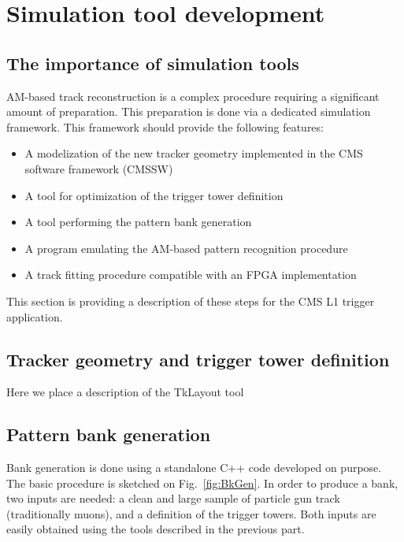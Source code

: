 \section{Simulation tool development}

\subsection{The importance of simulation tools}

\noindent AM-based track reconstruction is a complex procedure requiring a significant amount of preparation. This preparation is done via a dedicated simulation framework. This framework should provide the following features:

\begin{itemize}
\item A modelization of the new tracker geometry implemented in the CMS software framework (CMSSW)
\item A tool for optimization of the trigger tower definition
\item A tool performing the pattern bank generation
\item A program emulating the AM-based pattern recognition procedure
\item A track fitting procedure compatible with an FPGA implementation  
\end{itemize}

\noindent This section is providing a description of these steps for the CMS L1 trigger application. 

\subsection{Tracker geometry and trigger tower definition}

\noindent Here we place a description of the TkLayout tool

\subsection{Pattern bank generation}

\noindent Bank generation is done using a standalone C++ code developed on purpose. The basic procedure is sketched on Fig.~\ref{fig:BkGen}. In order to produce a bank, two inputs are needed: a clean and large sample of particle gun track (traditionally muons), and a definition of the trigger towers. Both inputs are easily obtained using the tools described in the previous part. 

